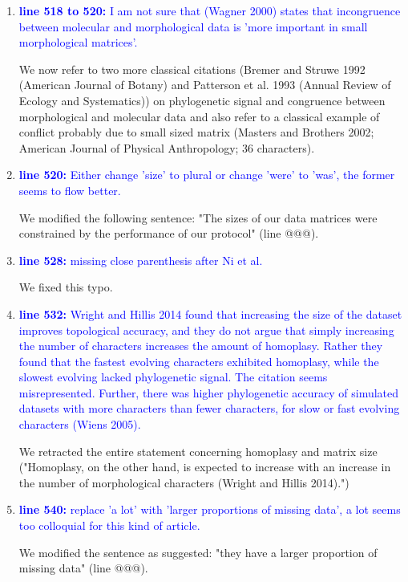 \documentclass[12pt,letterpaper]{article}
\begin{document}
\begin{enumerate}
\item{\textcolor{blue}{\textbf{line 518 to 520:} I am not sure that (Wagner 2000) states that incongruence between molecular and morphological data is 'more important in small morphological matrices'. }}

We now refer to two more classical citations (Bremer and Struwe 1992 (American Journal of Botany) and Patterson et al. 1993 (Annual Review of Ecology and Systematics)) on phylogenetic signal and congruence between morphological and molecular data and also refer to a classical example of conflict probably due to small sized matrix (Masters and Brothers 2002; American Journal of Physical Anthropology; 36 characters).

\item{\textcolor{blue}{\textbf{line 520:} Either change 'size' to plural or change 'were' to 'was', the former seems to flow better. }}

We modified the following sentence: "The sizes of our data matrices were constrained by the performance of our protocol" (line @@@).

\item{\textcolor{blue}{\textbf{line 528:} missing close parenthesis after Ni et al.}}

We fixed this typo.

\item{\textcolor{blue}{\textbf{line 532:} Wright and Hillis 2014 found that increasing the size of the dataset improves topological accuracy, and they do not argue that simply increasing the number of characters increases the amount of homoplasy. Rather they found that the fastest evolving characters exhibited homoplasy, while the slowest evolving lacked phylogenetic signal. The citation seems misrepresented. Further, there was higher phylogenetic accuracy of simulated datasets with more characters than fewer characters, for slow or fast evolving characters (Wiens 2005).}}

We retracted the entire statement concerning homoplasy and matrix size ("Homoplasy, on the other hand, is expected to increase with an increase in the number of morphological characters (Wright and Hillis 2014).")

\item{\textcolor{blue}{\textbf{line 540:} replace 'a lot' with 'larger proportions of missing data', a lot seems too colloquial for this kind of article. }}

We modified the sentence as suggested: "they have a larger proportion of missing data" (line @@@).


\end{enumerate}
\end{document}
